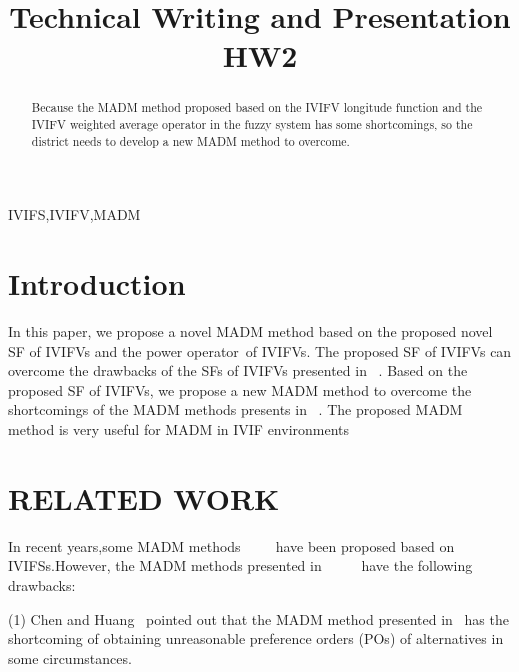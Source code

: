 \documentclass[twocolumn]{IEEEtran}
\begin{document}
\title{Technical Writing and Presentation HW2}

\author{
}

\maketitle

\begin{abstract}
Because the MADM method proposed based on the IVIFV longitude function and the IVIFV weighted average operator in the fuzzy system has some shortcomings, so the district needs to develop a new MADM method to overcome.
\end{abstract}

\begin{IEEEkeywords}
IVIFS,IVIFV,MADM
\end{IEEEkeywords}

\section{Introduction}
In this paper, we propose a novel MADM method based on the proposed novel SF of IVIFVs and the power operator~\cite{An2007}of IVIFVs. The proposed SF of IVIFVs can overcome the drawbacks of the SFs of IVIFVs presented in ~\cite{Bai2013}. Based on the proposed SF of IVIFVs, we propose a new MADM method to overcome the shortcomings of the MADM methods presents in ~\cite{chen1997}. The proposed MADM method is very useful for MADM in IVIF environments


\section{RELATED WORK}
In recent years,some MADM methods~\cite{chen2015}~\cite{chen2017}~\cite{chen2021}~\cite{chen2010}~\cite{Zhao2011}have been proposed based on IVIFSs.However, the MADM methods presented in~\cite{chen2015}~\cite{chen2017}~\cite{chen2021}~\cite{chen2010}~\cite{Zhao2011} have the following drawbacks:

    (1) Chen and Huang~\cite{chen2017_2} pointed out that the MADM method presented in~\cite{chen2015} has the shortcoming of obtaining unreasonable preference orders (POs) of alternatives in some circumstances.
    
\end{document}
